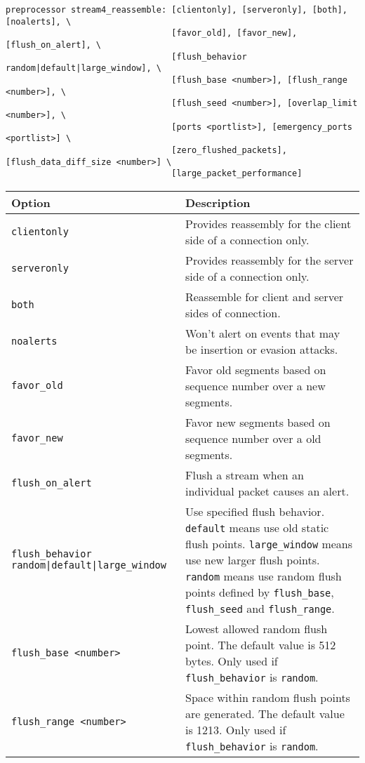 \documentclass[english]{report}
\begin{document}
\begin{verbatim}
preprocessor stream4_reassemble: [clientonly], [serveronly], [both], [noalerts], \
                                 [favor_old], [favor_new], [flush_on_alert], \
                                 [flush_behavior random|default|large_window], \
                                 [flush_base <number>], [flush_range <number>], \
                                 [flush_seed <number>], [overlap_limit <number>], \
                                 [ports <portlist>], [emergency_ports <portlist>] \
                                 [zero_flushed_packets], [flush_data_diff_size <number>] \
                                 [large_packet_performance]
\end{verbatim}
\begin{tabular}{| p{0.50\textwidth} | p{0.50\textwidth} |}
\hline
\textbf{Option} & \textbf{Description}\\
\hline
\hline
\texttt{clientonly} & Provides reassembly for the client side of a connection
only.\\
\hline
\texttt{serveronly} & Provides reassembly for the server side of a connection
only.\\
\hline
\texttt{both} & Reassemble for client and server sides of connection.\\
\hline
\texttt{noalerts} & Won't alert on events that may be insertion or evasion
attacks.\\
\hline
\texttt{favor\_old} & Favor old segments based on sequence number over a new segments. \\
\hline
\texttt{favor\_new} & Favor new segments based on sequence number over a old segments. \\
\hline
\texttt{flush\_on\_alert} & Flush a stream when an individual packet causes an alert.\\
\hline
\texttt{flush\_behavior random|default|large\_window} & Use specified flush behavior. \texttt{default} means use old static flush points. \texttt{large\_window} means use new larger flush points. \texttt{random} means use random flush points defined by \texttt{flush\_base}, \texttt{flush\_seed} and \texttt{flush\_range}.\\
\hline
\texttt{flush\_base <number>} & Lowest allowed random flush point.  The default value is 512 bytes.  Only used if \texttt{flush\_behavior} is \texttt{random}. \\
\hline
\texttt{flush\_range <number>} & Space within random flush points are generated.  The default value is 1213.  Only used if \texttt{flush\_behavior} is \texttt{random}. \\

\end{tabular}
\end{document}
